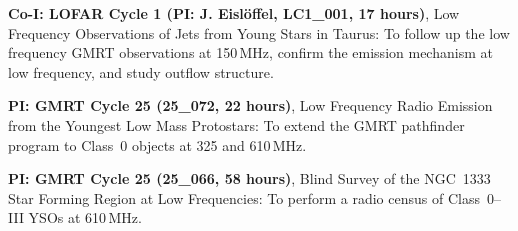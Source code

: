 \begin{cvpubs}
{\begin{cvlist}
  \item {\textbf{Co-I: LOFAR Cycle 1 (PI: J. Eisl{\"o}ffel, LC1\_001, 17 hours)}, Low Frequency Observations of Jets from Young Stars in Taurus: To follow up the low frequency GMRT observations at 150\,MHz, confirm the emission mechanism at low frequency, and study outflow structure.}
  \item {\textbf{PI: GMRT Cycle 25 (25\_072, 22 hours)}, Low Frequency Radio Emission from the Youngest Low Mass Protostars: To extend the GMRT pathfinder program to Class~0 objects at 325 and 610\,MHz.}
  \item {\textbf{PI: GMRT Cycle 25 (25\_066, 58 hours)}, Blind Survey of the NGC~1333 Star Forming Region at Low Frequencies: To perform a radio census of Class~0--III YSOs at 610\,MHz.}
      \end{cvlist}
    }
\vspace{-11pt}
\end{cvpubs}